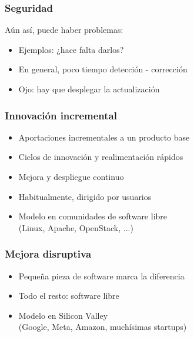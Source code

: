 \documentclass[17pt,aspectratio=169]{beamer}
\begin{document}

\begin{frame}
\frametitle{Seguridad}

Aún así, puede haber problemas:

\begin{itemize}
\item Ejemplos: ¿hace falta darlos?
\item En general, poco tiempo detección - corrección
\item Ojo: hay que desplegar la actualización
\end{itemize}
\end{frame}


\begin{frame}
\frametitle{Innovación incremental}

\begin{itemize}
\item Aportaciones incrementales a un producto base
\item Ciclos de innovación y realimentación rápidos
\item Mejora y despliegue continuo
\item Habitualmente, dirigido por usuarios
\item Modelo en comunidades de software libre \\
  (Linux, Apache, OpenStack, ...) \\
\end{itemize}

\end{frame}


\begin{frame}
\frametitle{Mejora disruptiva}

\begin{itemize}
\item Pequeña pieza de software marca la diferencia
\item Todo el resto: software libre
\item Modelo en Silicon Valley \\
  (Google, Meta, Amazon, muchísimas startups) \\
\end{itemize}

\end{frame}
\end{document}
